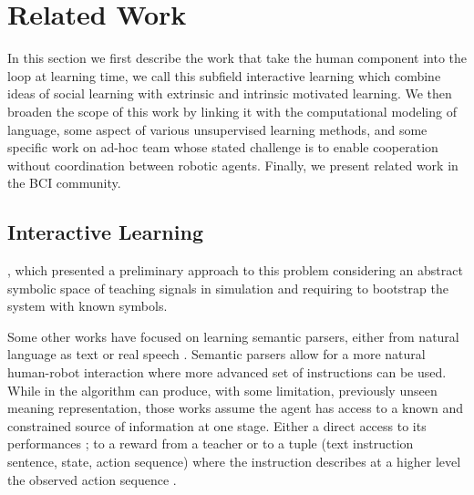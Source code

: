 
\chapter{Related Work}
\label{chapter:relatedwork}
\minitoc

In this section we first describe the work that take the human component into the loop at learning time, we call this subfield interactive learning which combine ideas of social learning with extrinsic and intrinsic motivated learning. We then broaden the scope of this work by linking it with the computational modeling of language, some aspect of various unsupervised learning methods, and some specific work on ad-hoc team whose stated challenge is to enable cooperation without coordination between robotic agents. Finally, we present related work in the BCI community.

\section{Interactive Learning}

\cite{macl11simul}, which presented a preliminary approach to this problem considering an abstract symbolic space of teaching signals in simulation and requiring to bootstrap the system with known symbols. 

Some other works have focused on learning semantic parsers, either from natural language as text \cite{branavan2011learning,kim2012unsupervised} or real speech \cite{doshi2008spoken}. Semantic parsers allow for a more natural human-robot interaction where more advanced set of instructions can be used. While in \cite{kim2012unsupervised} the algorithm can produce, with some limitation, previously unseen meaning representation, those works assume the agent has access to a known and constrained source of information at one stage. Either a direct access to its performances \cite{branavan2011learning}; to a reward from a teacher \cite{doshi2008spoken} or to a tuple (text instruction sentence, state, action sequence) where the instruction describes at a higher level the observed action sequence \cite{kim2012unsupervised}.


